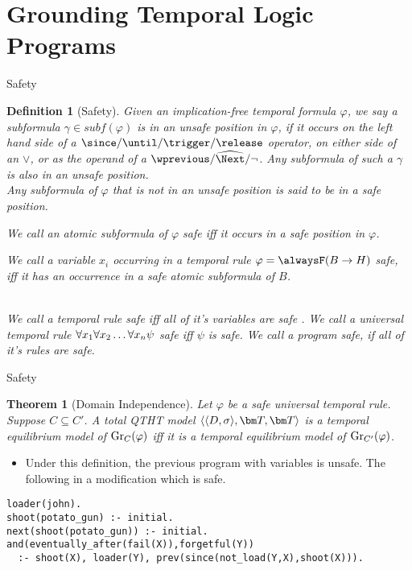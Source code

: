 \documentclass[aspectratio=169,xcolor=svgnames]{beamer}
\theoremstyle{theoremstyle_space}
\newtheorem{definition}{Definition}
\newtheorem{theorem}{Theorem}
\begin{document}
\section{Grounding Temporal Logic Programs}

\begin{frame}[t]{Safety}
\begin{definition}[Safety]
  Given an implication-free temporal formula $\varphi$, we say a
  subformula $\gamma \in subf(\varphi)$ is in an unsafe position in
  $\varphi$, if it occurs on the left hand side of a
  $\since/\until/\trigger/\release$ operator, on either side of an
  $\lor$, or as the operand of a $\wprevious/\wnext/\lnot$. Any
  subformula of such a $\gamma$ is also in an unsafe position.\\

  Any subformula of $\varphi$ that is not in an unsafe position is
  said to be in a \textit{safe position}.
  
  We call an atomic subformula of $\varphi$ safe iff it occurs in a
  safe position in $\varphi$.

  We call a variable $x_i$ occurring in a temporal rule
  $\varphi = \alwaysF(B \rightarrow H)$ safe, iff it has an occurrence
  in a safe atomic subformula of $B$. 

  \\We call a temporal rule safe iff all of it's variables are safe
  . We call a universal temporal rule $\forall x_1 \forall x_2 \dots \forall x_n \psi$ safe iff $\psi$
  is safe. We call a program safe, if all of it's rules are safe.
\end{definition}
\end{frame}

\begin{frame}[t,fragile]{Safety}
\begin{theorem}[Domain Independence]
  Let $\varphi$ be a safe universal temporal rule. Suppose
  $C \subseteq C'$. A total QTHT model $\qttandt$ is a temporal
  equilibrium model of $\operatorname{Gr}_{C}(\varphi)$ iff it is a temporal
  equilibrium model of $\operatorname{Gr}_{C'}(\varphi)$.
\end{theorem}
\begin{itemize}
\item Under this definition, the previous program with variables is
  unsafe. The following in a modification which is safe.
\end{itemize}
  \begin{lstlisting}[language=clingo,numbers=none]
loader(john).
shoot(potato_gun) :- initial.
next(shoot(potato_gun)) :- initial.
and(eventually_after(fail(X)),forgetful(Y)) 
  :- shoot(X), loader(Y), prev(since(not_load(Y,X),shoot(X))).
  \end{lstlisting}
\end{frame}
\end{document}
